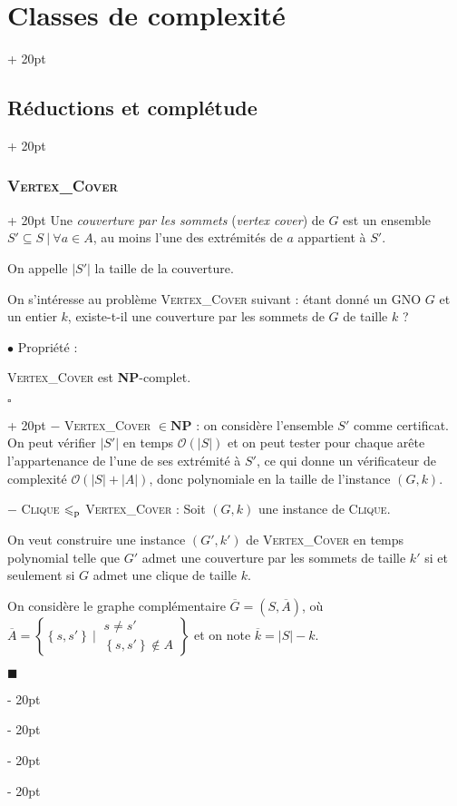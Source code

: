 \documentclass[a4paper, 12pt, twoside]{article}
\newcommand{\cj}[1]{\overline{#1}} %
\newcommand{\set}[1]{\left\{ #1 \right\}}
\newcommand{\abs}[1]{\left\lvert #1 \right\rvert}
\renewcommand{\le}{\leqslant}
\newcommand{\ind}[1][20pt]{\advance\leftskip + #1}
\newcommand{\deind}[1][20pt]{\advance\leftskip - #1}
\newenvironment{indt}[2][20pt]{#2 \par \ind[#1]}{\par \deind} %
\newenvironment{proof}[1][{}]{\begin{indt}{$\square$ #1}}{$\blacksquare$ \end{indt}}
\begin{document}
\begin{indt}{\section{Classes de complexité}}
\begin{indt}{\subsection{Réductions et complétude}}
\begin{indt}{\subsubsection{\textsc{Vertex\_Cover}}}
                Une \emph{couverture par les sommets} (\textit{vertex cover}) de $G$ est un ensemble $S' \subseteq S\ |\ \forall a \in A$, au moins l'une des extrémités de $a$ appartient à $S'$.

                On appelle $\abs{S'}$ la taille de la couverture.

                \vspace{6pt}
                
                On s'intéresse au problème \textsc{Vertex\_Cover} suivant : étant donné un GNO $G$ et un entier $k$, existe-t-il une couverture par les sommets de $G$ de taille $k$ ?

                \vspace{12pt}
                
                $\bullet$ Propriété :
                \begin{emphBox}
                    \textsc{Vertex\_Cover} est \textbf{NP}-complet.
                \end{emphBox}

                \vspace{6pt}
                
                \begin{proof}
                    $-$ \textsc{Vertex\_Cover} $\in \mathbf{NP}$ : on considère l'ensemble $S'$ comme certificat.
                    On peut vérifier $\abs{S'}$ en temps $\mathcal O(\abs S)$ et on peut tester pour chaque arête l'appartenance de l'une de ses extrémité à $S'$, ce qui donne un vérificateur de complexité $\mathcal O(\abs S + \abs A)$, donc polynomiale en la taille de l'instance $(G, k)$.

                    \vspace{6pt}
                    
                    $-$ \textsc{Clique} $\le_{\rm p}$ \textsc{Vertex\_Cover} :
                    Soit $(G, k)$ une instance de \textsc{Clique}.

                    On veut construire une instance $(G', k')$ de \textsc{Vertex\_Cover} en temps polynomial telle que $G'$ admet une couverture par les sommets de taille $k'$ si et seulement si $G$ admet une clique de taille $k$.

                    On considère le graphe complémentaire $\cj G = (S, \cj A)$, où
                    $
                        \cj A =
                        \set{
                            \set{s, s'}\ |\
                            \begin{array}{|l}
                                s \neq s'
                                \\
                                \set{s, s'} \notin A
                            \end{array}
                        }
                    $
                    et on note $\cj k = \abs S - k$.


\end{proof}
\end{indt}
\end{indt}
\end{indt}
\end{document}
